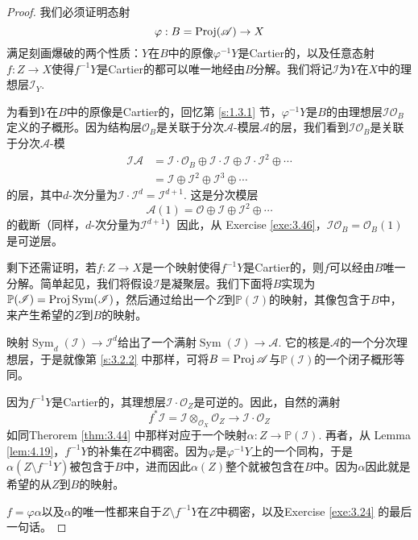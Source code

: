 \begin{proof}
	我们必须证明态射
\[
	\varphi:B=\operatorname{Proj}(\mathscr A)\to X
\]
满足刻画爆破的两个性质：$Y$在$B$中的原像$\varphi^{-1}Y$是Cartier的，以及任意态射$f:Z\to X$使得$f^{-1}Y$是Cartier的都可以唯一地经由$B$分解。我们将记$\mathscr I$为$Y$在$X$中的理想层$\mathscr I_Y$.

为看到$Y$在$B$中的原像是Cartier的，回忆第 \ref{s:1.3.1} 节，$\varphi^{-1}Y$是$B$的由理想层$\mathscr I\mathscr O_B$定义的子概形。因为结构层$\mathscr O_B$是关联于分次$\mathscr A$-模层$\mathscr A$的层，我们看到$\mathscr I\mathscr O_B$是关联于分次$\mathscr A$-模
\[
	\begin{aligned}
	\mathscr I\mathscr A&=\mathscr I\cdot \mathscr O_B\oplus \mathscr I\cdot \mathscr I\oplus \mathscr I\cdot \mathscr I^2 \oplus \cdots\\
	&=\mathscr I\oplus \mathscr I^2 \oplus \mathscr I^3\oplus \cdots
	\end{aligned}
\]
的层，其中$d$-次分量为$\mathscr I\cdot \mathscr I^d=\mathscr I^{d+1}$. 这是分次模层
\[
	\mathscr A(1)=\mathscr O\oplus \mathscr I \oplus \mathscr I^2\oplus \cdots
\]
的截断（同样，$d$-次分量为$\mathscr I^{d+1}$）因此，从 Exercise \ref{exe:3.46}，$\mathscr I\mathscr O_B=\mathscr O_B(1)$是可逆层。


剩下还需证明，若$f:Z\to X$是一个映射使得$f^{-1}Y$是Cartier的，则$f$可以经由$B$唯一分解。简单起见，我们将假设$\mathscr I$是凝聚层。我们下面将$B$实现为$\mathbb P(\mathscr I)=\operatorname{Proj} \operatorname{Sym}(\mathscr I)$，然后通过给出一个$Z$到$\mathbb P(\mathscr I)$的映射，其像包含于$B$中，来产生希望的$Z$到$B$的映射。

映射$\operatorname{Sym}_d(\mathscr I)\to \mathscr I^d$给出了一个满射$\operatorname{Sym}(\mathscr I)\to \mathscr A$. 它的核是$\mathscr A$的一个分次理想层，于是就像第 \ref{s:3.2.2} 中那样，可将$B=\operatorname{Proj} \mathscr A$与$\mathbb P(\mathscr I)$的一个闭子概形等同。

因为$f^{-1}Y$是Cartier的，其理想层$\mathscr I\cdot \mathscr O_Z$是可逆的。因此，自然的满射
\[
	f^*\mathscr I=\mathscr I\otimes_{\mathscr O_X}\mathscr O_Z\to \mathscr I\cdot \mathscr O_Z
\]
如同Therorem \ref{thm:3.44} 中那样对应于一个映射$\alpha:Z\to \mathbb P(\mathscr I)$. 再者，从 Lemma \ref{lem:4.19}，$f^{-1}Y$的补集在$Z$中稠密。因为$\varphi$是$\varphi^{-1}Y$上的一个同构，于是$\alpha(Z\setminus f^{-1}Y)$被包含于$B$中，进而因此$\alpha(Z)$整个就被包含在$B$中。因为$\alpha$因此就是希望的从$Z$到$B$的映射。

$f=\varphi\alpha$以及$\alpha$的唯一性都来自于$Z\setminus f^{-1}Y$在$Z$中稠密，以及Exercise \ref{exe:3.24} 的最后一句话。
\end{proof}

